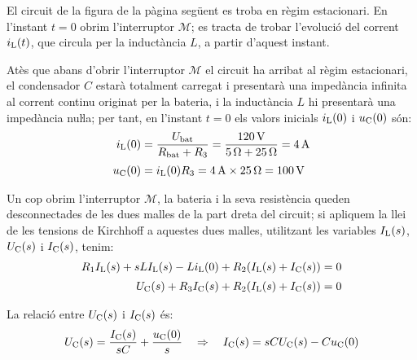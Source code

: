 \begin{exemple}\label{ex:CircuitLaplace}
	\addcontentsxms{\CircuitLaplace}
    El circuit de la figura de la pàgina següent es troba en règim estacionari. En
    l'instant $t=0$ obrim l'interruptor $\mathscr{M}$; es tracta de trobar
    l'evolució del corrent $i_\mathrm{L}(t)$, que circula per la inductància
    $L$, a partir d'aquest instant.

      Atès que abans d'obrir l'interruptor $\mathscr{M}$ el circuit ha arribat al
     règim estacionari, el condensador $C$ estarà totalment carregat  i
     presentarà una impedància infinita al corrent continu originat per la
     bateria, i la inductància $L$ hi presentarà una impedància nuŀla;
     per tant, en l'instant $t=0$ els valors inicials $i_\mathrm{L}(0)$ i
     $u_\mathrm{C}(0)$ són:
     \begin{align*}
        i_\mathrm{L}(0) &= \frac{U_\mathrm{bat}}{R_\mathrm{bat} + R_3} = \frac{\qty{120}{V}}
        {\qty{5}{\ohm} + \qty{25}{\ohm}} = \qty{4}{A} \\[0.5ex]
        u_\mathrm{C}(0) &= i_\mathrm{L}(0) R_3 = \qty{4}{A}\times \qty{25}{\ohm} = \qty{100}{V}
     \end{align*}

  \begin{center}
	
\end{center}

    Un cop obrim l'interruptor $\mathscr{M}$, la bateria i la seva resistència
    queden desconnectades de les dues malles de la part dreta del circuit; si apliquem la llei de les tensions de Kirchhoff  a aquestes
    dues malles, utilitzant les variables $I_\mathrm{L}(s)$, $U_\mathrm{C}(s)$ i
    $I_\mathrm{C}(s)$, tenim:
    \begin{align*}
        R_1 I_\mathrm{L}(s) + s L I_\mathrm{L}(s) - L i_\mathrm{L}(0) + R_2
        (I_\mathrm{L}(s) + I_\mathrm{C}(s)) &=0 \\[0.5ex]
        U_\mathrm{C}(s) + R_3 I_\mathrm{C}(s) + R_2 (I_\mathrm{L}(s) + I_\mathrm{C}(s)) &=0
    \end{align*}

    La relació entre $U_\mathrm{C}(s)$ i $I_\mathrm{C}(s)$ és:
    \begin{equation*}
        U_\mathrm{C}(s) = \frac{I_\mathrm{C}(s)}{s C} + \frac{u_\mathrm{C}(0)}{s}
        \quad\Rightarrow\quad I_\mathrm{C}(s) = s C U_\mathrm{C}(s) - C u_\mathrm{C}(0)
    \end{equation*}


\end{exemple}
